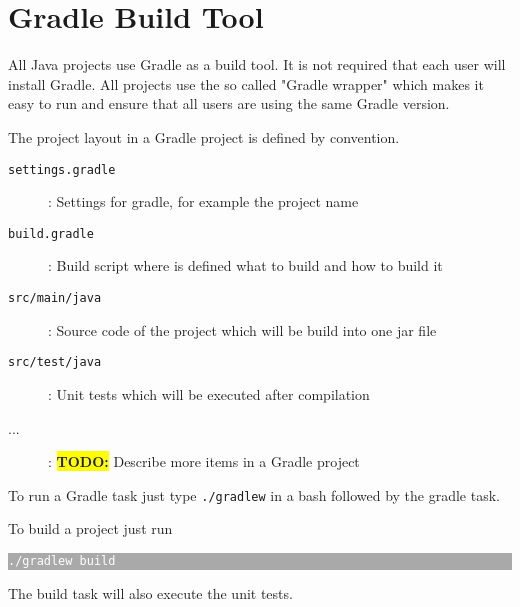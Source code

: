 \documentclass[a4paper]{article}
\newcommand{\todo}[1]{\colorbox{yellow}{\textbf{TODO:}} #1 }
\newcommand{\code}[1]{\texttt{#1}}
\newcommand{\terminal}[1]{

\colorbox{darkgray}{\parbox{\linewidth}{\texttt{\textcolor{white}{\footnotesize{#1}}}}}

}
\begin{document}
\section{Gradle Build Tool}

	All Java projects use Gradle as a build tool. It is not required that
	each user will install Gradle. All projects use the so called 
	"Gradle wrapper" which makes it easy to run and ensure that all users
	are using the same Gradle version.

	The project layout in a Gradle project is defined by convention.

	\begin{description}

		\item[\code{settings.gradle}]: Settings for gradle, for example
		the project name

		\item[\code{build.gradle}]: Build script where is defined what
		to build and how to build it

		\item[\code{src/main/java}]: Source code of the project which will
		be build into one jar file

		\item[\code{src/test/java}]: Unit tests which will be executed after
		compilation

		\item[...]: \todo{Describe more items in a Gradle project}

	\end{description}

	To run a Gradle task just type \code{./gradlew} in a bash
	followed by the gradle task.

	To build a project just run 

	\terminal{./gradlew build}

	The build task will also execute the unit tests. 
\end{document}
